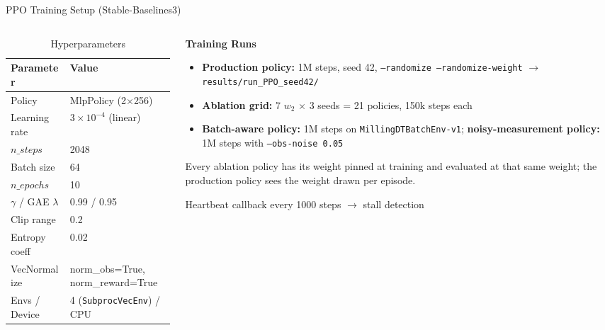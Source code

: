 \documentclass[11pt,aspectratio=169]{beamer}
\begin{document}
\begin{frame}{PPO Training Setup (Stable-Baselines3)}
    \begin{columns}[T]
        \begin{column}{0.5\textwidth}
            \begin{table}
            \centering
            \scriptsize
            \caption{Hyperparameters}
            \begin{tabular}{@{}ll@{}}
            \toprule
            \textbf{Parameter} & \textbf{Value} \\
            \midrule
            Policy & MlpPolicy (2$\times$256) \\
            Learning rate & $3\times10^{-4}$ (linear) \\
            $n\_steps$ & 2048 \\
            Batch size & 64 \\
            $n\_epochs$ & 10 \\
            $\gamma$ / GAE $\lambda$ & 0.99 / 0.95 \\
            Clip range & 0.2 \\
            Entropy coeff & 0.02 \\
            VecNormalize & norm\_obs=True, norm\_reward=True \\
            Envs / Device & 4 (\texttt{SubprocVecEnv}) / CPU \\
            \bottomrule
            \end{tabular}
            \end{table}
        \end{column}
        \begin{column}{0.5\textwidth}
            \textbf{Training Runs}
            \begin{itemize}
                \item \textbf{Production policy:} 1M steps, seed 42,
                      \texttt{--randomize --randomize-weight}
                      $\to$ \texttt{results/run\_PPO\_seed42/}
                \item \textbf{Ablation grid:} 7 $w_2$ $\times$ 3 seeds = 21 policies,
                      150k steps each
                \item \textbf{Batch-aware policy:} 1M steps on
                      \texttt{MillingDTBatchEnv-v1}; \textbf{noisy-measurement policy:}
                      1M steps with \texttt{--obs-noise 0.05}
            \end{itemize}

            \vspace{0.3em}
            \footnotesize
            Every ablation policy has its weight \alert{pinned} at training and evaluated at that
            same weight; the production policy sees the weight drawn per episode.

            \vspace{0.4em}
            \alert{Heartbeat callback} every 1000 steps $\to$ stall detection
        \end{column}
    \end{columns}
\end{frame}
\end{document}
